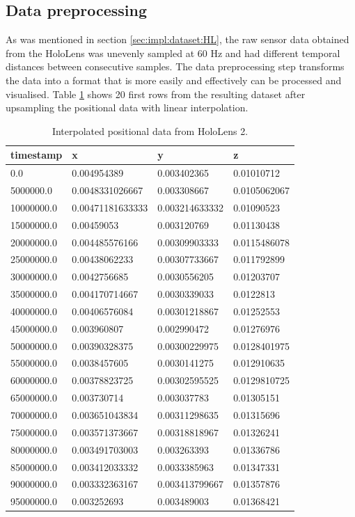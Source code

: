 \subsection{Data preprocessing}
\label{sec:impl:dataset:preprocessing}
As was mentioned in section \ref*{sec:impl:dataset:HL}, the raw sensor data obtained from the HoloLens was unevenly sampled at 60 Hz and had different temporal distances between consecutive samples. The data preprocessing step transforms the data into a format that is more easily and effectively can be processed and visualised. Table \ref{tab:inter_data_pos} shows 20 first rows from the resulting dataset after upsampling the positional data with linear interpolation.
\begin{table}[!ht]
	\footnotesize
	\centering
	\begin{tabular}{|l|l|l|l|}
		\hline
		timestamp & x & y & z \\ [0.5ex] 
		\hline\hline
		0.0 & 0.004954389 & 0.003402365 & 0.01010712 \\ \hline
		5000000.0 & 0.0048331026667 & 0.003308667 & 0.0105062067 \\ \hline
		10000000.0 & 0.00471181633333 & 0.003214633332 & 0.01090523 \\ \hline
		15000000.0 & 0.00459053 & 0.003120769 & 0.01130438 \\ \hline
		20000000.0 & 0.004485576166 & 0.00309903333 & 0.0115486078 \\ \hline
		25000000.0 & 0.00438062233 & 0.00307733667 & 0.011792899 \\ \hline
		30000000.0 & 0.0042756685 & 0.0030556205 & 0.01203707 \\ \hline
		35000000.0 & 0.004170714667 & 0.0030339033 & 0.0122813 \\ \hline
		40000000.0 & 0.00406576084 & 0.00301218867 & 0.01252553 \\ \hline
		45000000.0 & 0.003960807 & 0.002990472 & 0.01276976 \\ \hline
		50000000.0 & 0.00390328375 & 0.00300229975 & 0.0128401975 \\ \hline
		55000000.0 & 0.0038457605 & 0.0030141275 & 0.012910635 \\ \hline
		60000000.0 & 0.00378823725 & 0.00302595525 & 0.0129810725 \\ \hline
		65000000.0 & 0.003730714 & 0.003037783 & 0.01305151 \\ \hline
		70000000.0 & 0.003651043834 & 0.00311298635 & 0.01315696 \\ \hline
		75000000.0 & 0.003571373667 & 0.00318818967 & 0.01326241 \\ \hline
		80000000.0 & 0.003491703003 & 0.003263393 & 0.01336786 \\ \hline
		85000000.0 & 0.003412033332 & 0.0033385963 & 0.01347331 \\ \hline
		90000000.0 & 0.003332363167 & 0.003413799667 & 0.01357876 \\ \hline
		95000000.0 & 0.003252693 & 0.003489003 & 0.01368421 \\ \hline
	\end{tabular}
	\caption{\label{tab:inter_data_pos}Interpolated positional data from HoloLens 2.}
\end{table}

